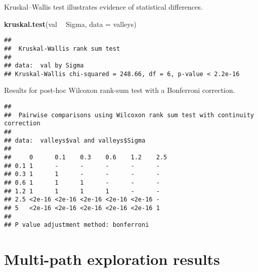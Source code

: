 \documentclass[]{book}
\newenvironment{Shaded}{\begin{snugshade}}{\end{snugshade}}
\newcommand{\DataTypeTok}[1]{\textcolor[rgb]{0.13,0.29,0.53}{#1}}
\newcommand{\KeywordTok}[1]{\textcolor[rgb]{0.13,0.29,0.53}{\textbf{#1}}}
\newcommand{\NormalTok}[1]{#1}
\newcommand{\OperatorTok}[1]{\textcolor[rgb]{0.81,0.36,0.00}{\textbf{#1}}}
\newcommand{\OtherTok}[1]{\textcolor[rgb]{0.56,0.35,0.01}{#1}}
\newcommand{\StringTok}[1]{\textcolor[rgb]{0.31,0.60,0.02}{#1}}
\begin{document}
Kruskal--Wallis test illustrates evidence of statistical differences.

\begin{Shaded}
\begin{Highlighting}[]
\KeywordTok{kruskal.test}\NormalTok{(val }\OperatorTok{~}\StringTok{ }\NormalTok{Sigma, }\DataTypeTok{data =}\NormalTok{ valleys)}
\end{Highlighting}
\end{Shaded}

\begin{verbatim}
## 
##  Kruskal-Wallis rank sum test
## 
## data:  val by Sigma
## Kruskal-Wallis chi-squared = 248.66, df = 6, p-value < 2.2e-16
\end{verbatim}

Results for post-hoc Wilcoxon rank-sum test with a Bonferroni correction.

\begin{Shaded}
\end{Shaded}

\begin{verbatim}
## 
##  Pairwise comparisons using Wilcoxon rank sum test with continuity correction 
## 
## data:  valleys$val and valleys$Sigma 
## 
##     0      0.1    0.3    0.6    1.2    2.5
## 0.1 1      -      -      -      -      -  
## 0.3 1      1      -      -      -      -  
## 0.6 1      1      1      -      -      -  
## 1.2 1      1      1      1      -      -  
## 2.5 <2e-16 <2e-16 <2e-16 <2e-16 <2e-16 -  
## 5   <2e-16 <2e-16 <2e-16 <2e-16 <2e-16 1  
## 
## P value adjustment method: bonferroni
\end{verbatim}

\hypertarget{multi-path-exploration-results-2}{%
\section{Multi-path exploration results}\label{multi-path-exploration-results-2}}
\end{document}
